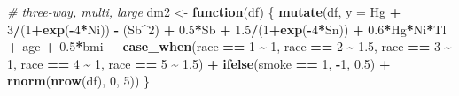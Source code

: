 \documentclass[12pt, twoside]{amherstthesis}
\newenvironment{Shaded}{\begin{snugshade}}{\end{snugshade}}
\newcommand{\AttributeTok}[1]{\textcolor[rgb]{0.13,0.29,0.53}{#1}}
\newcommand{\CommentTok}[1]{\textcolor[rgb]{0.56,0.35,0.01}{\textit{#1}}}
\newcommand{\ControlFlowTok}[1]{\textcolor[rgb]{0.13,0.29,0.53}{\textbf{#1}}}
\newcommand{\DecValTok}[1]{\textcolor[rgb]{0.00,0.00,0.81}{#1}}
\newcommand{\FloatTok}[1]{\textcolor[rgb]{0.00,0.00,0.81}{#1}}
\newcommand{\FunctionTok}[1]{\textcolor[rgb]{0.13,0.29,0.53}{\textbf{#1}}}
\newcommand{\NormalTok}[1]{#1}
\newcommand{\OtherTok}[1]{\textcolor[rgb]{0.56,0.35,0.01}{#1}}
\newcommand{\SpecialCharTok}[1]{\textcolor[rgb]{0.81,0.36,0.00}{\textbf{#1}}}
\begin{document}
\begin{Shaded}
\begin{Highlighting}[]
\CommentTok{\# three{-}way, multi, large}
\NormalTok{dm2 }\OtherTok{\textless{}{-}} \ControlFlowTok{function}\NormalTok{(df) \{}
  \FunctionTok{mutate}\NormalTok{(df, }\AttributeTok{y =} 
\NormalTok{           Hg }\SpecialCharTok{+} \DecValTok{3}\SpecialCharTok{/}\NormalTok{(}\DecValTok{1}\SpecialCharTok{+}\FunctionTok{exp}\NormalTok{(}\SpecialCharTok{{-}}\DecValTok{4}\SpecialCharTok{*}\NormalTok{Ni)) }\SpecialCharTok{{-}}\NormalTok{ (Sb}\SpecialCharTok{\^{}}\DecValTok{2}\NormalTok{) }\SpecialCharTok{+} \FloatTok{0.5}\SpecialCharTok{*}\NormalTok{Sb }\SpecialCharTok{+} \FloatTok{1.5}\SpecialCharTok{/}\NormalTok{(}\DecValTok{1}\SpecialCharTok{+}\FunctionTok{exp}\NormalTok{(}\SpecialCharTok{{-}}\DecValTok{4}\SpecialCharTok{*}\NormalTok{Sn)) }\SpecialCharTok{+} 
           \FloatTok{0.6}\SpecialCharTok{*}\NormalTok{Hg}\SpecialCharTok{*}\NormalTok{Ni}\SpecialCharTok{*}\NormalTok{Tl }\SpecialCharTok{+} 
\NormalTok{           age }\SpecialCharTok{+} \FloatTok{0.5}\SpecialCharTok{*}\NormalTok{bmi }\SpecialCharTok{+} 
           \FunctionTok{case\_when}\NormalTok{(race }\SpecialCharTok{==} \DecValTok{1} \SpecialCharTok{\textasciitilde{}} \DecValTok{1}\NormalTok{, }
\NormalTok{                     race }\SpecialCharTok{==} \DecValTok{2} \SpecialCharTok{\textasciitilde{}} \FloatTok{1.5}\NormalTok{, }
\NormalTok{                     race }\SpecialCharTok{==} \DecValTok{3} \SpecialCharTok{\textasciitilde{}} \DecValTok{1}\NormalTok{, }
\NormalTok{                     race }\SpecialCharTok{==} \DecValTok{4} \SpecialCharTok{\textasciitilde{}} \DecValTok{1}\NormalTok{, }
\NormalTok{                     race }\SpecialCharTok{==} \DecValTok{5} \SpecialCharTok{\textasciitilde{}} \FloatTok{1.5}\NormalTok{) }\SpecialCharTok{+}
           \FunctionTok{ifelse}\NormalTok{(smoke }\SpecialCharTok{==} \DecValTok{1}\NormalTok{, }\SpecialCharTok{{-}}\DecValTok{1}\NormalTok{, }\FloatTok{0.5}\NormalTok{) }\SpecialCharTok{+}
           \FunctionTok{rnorm}\NormalTok{(}\FunctionTok{nrow}\NormalTok{(df), }\DecValTok{0}\NormalTok{, }\DecValTok{5}\NormalTok{))}
\NormalTok{\}}


\end{Highlighting}
\end{Shaded}
\end{document}
